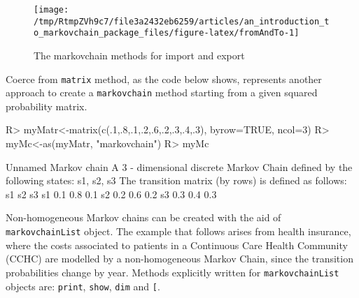 \documentclass[
  nojss]{jss}
\begin{document}
\begin{CodeChunk}
\begin{figure}

{\centering \texttt{[image: /tmp/RtmpZVh9c7/file3a2432eb6259/articles/an\_introduction\_to\_markovchain\_package\_files/figure-latex/fromAndTo-1]} 

}

\caption[The markovchain methods for import and export]{The markovchain methods for import and export}\label{fig:fromAndTo}
\end{figure}
\end{CodeChunk}

Coerce from \texttt{matrix} method, as the code below shows, represents another approach to create a \texttt{markovchain} method starting from a given squared probability matrix.

\begin{CodeChunk}

\begin{CodeInput}
R> myMatr<-matrix(c(.1,.8,.1,.2,.6,.2,.3,.4,.3), byrow=TRUE, ncol=3)
R> myMc<-as(myMatr, "markovchain")
R> myMc
\end{CodeInput}

\begin{CodeOutput}
Unnamed Markov chain 
 A  3 - dimensional discrete Markov Chain defined by the following states: 
 s1, s2, s3 
 The transition matrix  (by rows)  is defined as follows: 
    s1  s2  s3
s1 0.1 0.8 0.1
s2 0.2 0.6 0.2
s3 0.3 0.4 0.3
\end{CodeOutput}
\end{CodeChunk}

Non-homogeneous Markov chains can be created with the aid of \texttt{markovchainList} object. The example that follows arises from health insurance, where the costs associated to patients in a Continuous Care Health Community (CCHC) are modelled by a non-homogeneous Markov Chain, since the transition probabilities change by year. Methods explicitly written for \texttt{markovchainList} objects are: \texttt{print}, \texttt{show}, \texttt{dim} and \texttt{{[}}.
\end{document}
